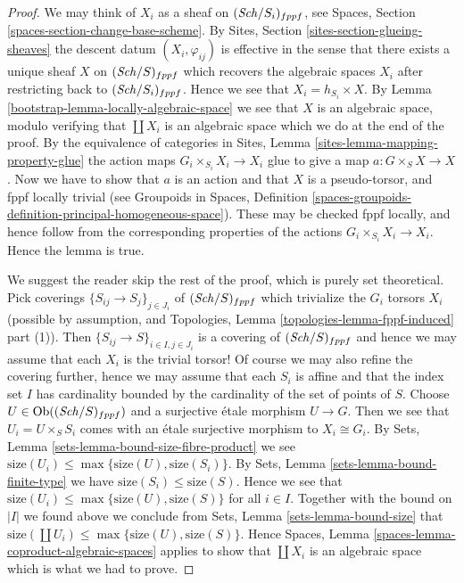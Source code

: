 \begin{proof}

We may think of $X_i$ as a sheaf on $(\mathit{Sch}/S_i)_{fppf}$, see
Spaces, Section \ref{spaces-section-change-base-scheme}.
By
Sites, Section \ref{sites-section-glueing-sheaves}
the descent datum $(X_i, \varphi_{ij})$ is effective in the sense that
there exists a unique sheaf $X$ on $(\mathit{Sch}/S)_{fppf}$ which
recovers the algebraic spaces $X_i$ after restricting back to
$(\mathit{Sch}/S_i)_{fppf}$. Hence we see that
$X_i = h_{S_i} \times X$. By
Lemma \ref{bootstrap-lemma-locally-algebraic-space}
we see that $X$ is an algebraic space, modulo verifying that $\coprod X_i$
is an algebraic space which we do at the end of the proof.
By the equivalence of categories in
Sites, Lemma \ref{sites-lemma-mapping-property-glue}
the action maps $G_i \times_{S_i} X_i \to X_i$
glue to give a map $a : G \times_S X \to X$.
Now we have to show that $a$ is an action and that $X$
is a pseudo-torsor, and fppf locally trivial (see
Groupoids in Spaces,
Definition \ref{spaces-groupoids-definition-principal-homogeneous-space}).
These may be checked fppf locally, and
hence follow from the corresponding properties of the actions
$G_i \times_{S_i} X_i \to X_i$. Hence the lemma is true.

\medskip\noindent
We suggest the reader skip the rest of the proof, which is purely set
theoretical. Pick coverings $\{S_{ij} \to S_j\}_{j \in J_i}$ of
$(\mathit{Sch}/S)_{fppf}$
which trivialize the $G_i$ torsors $X_i$ (possible by assumption, and
Topologies, Lemma \ref{topologies-lemma-fppf-induced} part (1)).
Then $\{S_{ij} \to S\}_{i \in I, j \in J_i}$ is a covering of
$(\mathit{Sch}/S)_{fppf}$ and hence we may assume that each $X_i$
is the trivial torsor! Of course we may also refine the covering further,
hence we may assume that each $S_i$ is affine and that the index
set $I$ has cardinality bounded by the cardinality of the set of points
of $S$. Choose $U \in \operatorname{Ob}((\mathit{Sch}/S)_{fppf})$ and a surjective
\'etale morphism $U \to G$. Then we see that $U_i = U \times_S S_i$ comes
with an \'etale surjective morphism to $X_i \cong G_i$. By
Sets, Lemma \ref{sets-lemma-bound-size-fibre-product}
we see $\text{size}(U_i) \leq \max\{\text{size}(U), \text{size}(S_i)\}$. By
Sets, Lemma \ref{sets-lemma-bound-finite-type}
we have $\text{size}(S_i) \leq \text{size}(S)$.
Hence we see that
$\text{size}(U_i) \leq \max\{\text{size}(U), \text{size}(S)\}$
for all $i \in I$. Together with the bound on $|I|$ we found above we
conclude from
Sets, Lemma \ref{sets-lemma-bound-size}
that $\text{size}(\coprod U_i) \leq \max\{\text{size}(U), \text{size}(S)\}$.
Hence
Spaces, Lemma \ref{spaces-lemma-coproduct-algebraic-spaces}
applies to show that $\coprod X_i$ is an algebraic space which is
what we had to prove.
\end{proof}

